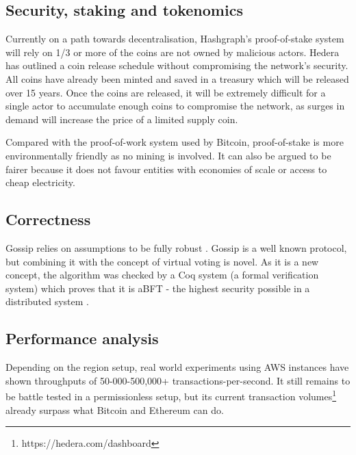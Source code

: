 \subsection{Security, staking and tokenomics}
Currently on a path towards decentralisation, Hashgraph's proof-of-stake system will rely on 1/3 or more of the coins are not owned by malicious actors. Hedera has outlined a coin release schedule without compromising the network's security. All coins have already been minted and saved in a treasury which will be released over 15 years\cite{economics2020hedera}. Once the coins are released, it will be extremely difficult for a single actor to accumulate enough coins to compromise the network, as surges in demand will increase the price of a limited supply coin.

Compared with the proof-of-work system used by Bitcoin, proof-of-stake is more environmentally friendly as no mining is involved. It can also be argued to be fairer because it does not favour entities with economies of scale or access to cheap electricity. 

\subsection{Correctness}
Gossip relies on assumptions to be fully robust \cite{alvisi}. Gossip is a well known protocol, but combining it with the concept of virtual voting is novel. As it is a new concept, the algorithm was checked by a Coq system (a formal verification system) which proves that it is aBFT - the highest security possible in a distributed system \cite{coq2018}.

\subsection{Performance analysis}
Depending on the region setup, real world experiments using AWS instances have shown throughputs of 50-000-500,000+ transactions-per-second\cite{baird2018hedera}. It still remains to be battle tested in a permissionless setup, but its current transaction volumes\footnote{https://hedera.com/dashboard} already surpass what Bitcoin and Ethereum can do.




